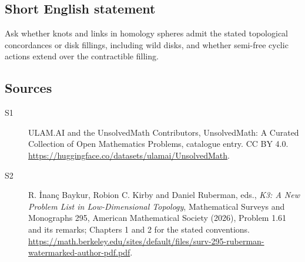 \documentclass[11pt]{article}
\begin{document}
\subsection{Short English statement}
Ask whether knots and links in homology spheres admit the stated topological concordances or disk fillings, including wild disks, and whether semi-free cyclic actions extend over the contractible filling.
\subsection{Sources}
\begin{description}
\item[\hypertarget{source:statement:1}{S1}] ULAM.AI and the UnsolvedMath Contributors, UnsolvedMath: A Curated Collection of Open Mathematics Problems, catalogue entry. CC BY 4.0. \url{https://huggingface.co/datasets/ulamai/UnsolvedMath}.
\item[\hypertarget{source:statement:2}{S2}] R. İnanç Baykur, Robion C. Kirby and Daniel Ruberman, eds., \emph{K3: A New Problem List in Low-Dimensional Topology}, Mathematical Surveys and Monographs 295, American Mathematical Society (2026), Problem 1.61 and its remarks; Chapters 1 and 2 for the stated conventions. \url{https://math.berkeley.edu/sites/default/files/surv-295-ruberman-watermarked-author-pdf.pdf}.
\end{description}
\label{end:statement}
\end{document}

